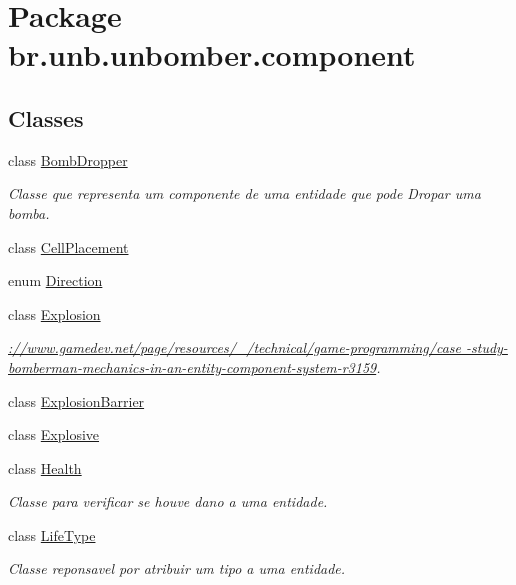 \hypertarget{namespacebr_1_1unb_1_1unbomber_1_1component}{\section{Package br.\+unb.\+unbomber.\+component}
\label{namespacebr_1_1unb_1_1unbomber_1_1component}
}
\subsection*{Classes}
\begin{DoxyCompactItemize}
\item 
class \hyperlink{classbr_1_1unb_1_1unbomber_1_1component_1_1_bomb_dropper}{Bomb\+Dropper}
\begin{DoxyCompactList}\small\item\em Classe que representa um componente de uma entidade que pode Dropar uma bomba. \end{DoxyCompactList}\item 
class \hyperlink{classbr_1_1unb_1_1unbomber_1_1component_1_1_cell_placement}{Cell\+Placement}
\item 
enum \hyperlink{enumbr_1_1unb_1_1unbomber_1_1component_1_1_direction}{Direction}
\item 
class \hyperlink{classbr_1_1unb_1_1unbomber_1_1component_1_1_explosion}{Explosion}
\begin{DoxyCompactList}\small\item\em \hyperlink{}{\+://www.gamedev.\+net/page/resources/\+\_\+/technical/game-\/programming/case -\/study-\/bomberman-\/mechanics-\/in-\/an-\/entity-\/component-\/system-\/r3159}. \end{DoxyCompactList}\item 
class \hyperlink{classbr_1_1unb_1_1unbomber_1_1component_1_1_explosion_barrier}{Explosion\+Barrier}
\item 
class \hyperlink{classbr_1_1unb_1_1unbomber_1_1component_1_1_explosive}{Explosive}
\item 
class \hyperlink{classbr_1_1unb_1_1unbomber_1_1component_1_1_health}{Health}
\begin{DoxyCompactList}\small\item\em Classe para verificar se houve dano a uma entidade. \end{DoxyCompactList}\item 
class \hyperlink{classbr_1_1unb_1_1unbomber_1_1component_1_1_life_type}{Life\+Type}
\begin{DoxyCompactList}\small\item\em Classe reponsavel por atribuir um tipo a uma entidade. \end{DoxyCompactList}\item 

\end{DoxyCompactItemize}
